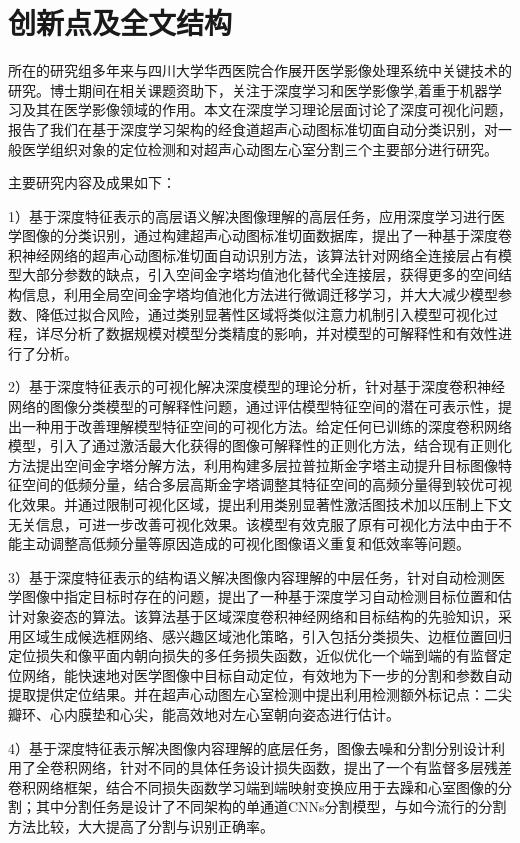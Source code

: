\section{创新点及全文结构}

所在的研究组多年来与四川大学华西医院合作展开医学影像处理系统中关键技术的研究。博士期间在相关课题资助下，关注于深度学习和医学影像学,着重于机器学习及其在医学影像领域的作用。本文在深度学习理论层面讨论了深度可视化问题，报告了我们在基于深度学习架构的经食道超声心动图标准切面自动分类识别，对一般医学组织对象的定位检测和对超声心动图左心室分割三个主要部分进行研究。

主要研究内容及成果如下：

1）基于深度特征表示的高层语义解决图像理解的高层任务，应用深度学习进行医学图像的分类识别，通过构建超声心动图标准切面数据库，提出了一种基于深度卷积神经网络的超声心动图标准切面自动识别方法，该算法针对网络全连接层占有模型大部分参数的缺点，引入空间金字塔均值池化替代全连接层，获得更多的空间结构信息，利用全局空间金字塔均值池化方法进行微调迁移学习，并大大减少模型参数、降低过拟合风险，通过类别显著性区域将类似注意力机制引入模型可视化过程，详尽分析了数据规模对模型分类精度的影响，并对模型的可解释性和有效性进行了分析。

2）基于深度特征表示的可视化解决深度模型的理论分析，针对基于深度卷积神经网络的图像分类模型的可解释性问题，通过评估模型特征空间的潜在可表示性，提出一种用于改善理解模型特征空间的可视化方法。给定任何已训练的深度卷积网络模型，引入了通过激活最大化获得的图像可解释性的正则化方法，结合现有正则化方法提出空间金字塔分解方法，利用构建多层拉普拉斯金字塔主动提升目标图像特征空间的低频分量，结合多层高斯金字塔调整其特征空间的高频分量得到较优可视化效果。并通过限制可视化区域，提出利用类别显著性激活图技术加以压制上下文无关信息，可进一步改善可视化效果。该模型有效克服了原有可视化方法中由于不能主动调整高低频分量等原因造成的可视化图像语义重复和低效率等问题。

3）基于深度特征表示的结构语义解决图像内容理解的中层任务，针对自动检测医学图像中指定目标时存在的问题，提出了一种基于深度学习自动检测目标位置和估计对象姿态的算法。该算法基于区域深度卷积神经网络和目标结构的先验知识，采用区域生成候选框网络、感兴趣区域池化策略，引入包括分类损失、边框位置回归定位损失和像平面内朝向损失的多任务损失函数，近似优化一个端到端的有监督定位网络，能快速地对医学图像中目标自动定位，有效地为下一步的分割和参数自动提取提供定位结果。并在超声心动图左心室检测中提出利用检测额外标记点：二尖瓣环、心内膜垫和心尖，能高效地对左心室朝向姿态进行估计。

4）基于深度特征表示解决图像内容理解的底层任务，图像去噪和分割分别设计利用了全卷积网络，针对不同的具体任务设计损失函数，提出了一个有监督多层残差卷积网络框架，结合不同损失函数学习端到端映射变换应用于去躁和心室图像的分割；其中分割任务是设计了不同架构的单通道CNNs分割模型，与如今流行的分割方法比较，大大提高了分割与识别正确率。


